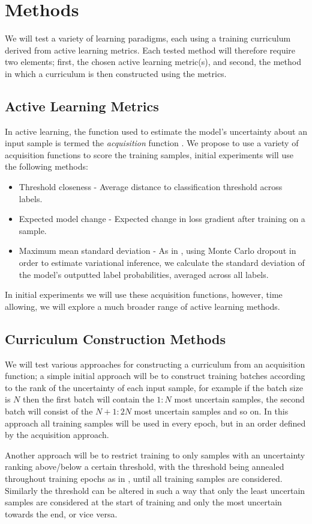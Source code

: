 \documentclass[a4paper,10pt]{article}
\begin{document}
\section{Methods}
We will test a variety of learning paradigms, each using a training curriculum derived from active learning metrics. Each tested method will therefore require two elements; first, the chosen active learning metric(s), and second, the method in which a curriculum is then constructed using the metrics. 
\subsection*{Active Learning Metrics}
In active learning, the function used to estimate the model's uncertainty about an input sample is termed the \textit{acquisition} function \cite{Settles 2009}. We propose to use a variety of acquisition functions to score the training samples, initial experiments will use the following methods:
\begin{itemize}
\item Threshold closeness - Average distance to classification threshold across labels.
\item Expected model change - Expected change in loss gradient after training on a sample.
\item Maximum mean standard deviation - As in \cite{Gal 2016}, using Monte Carlo dropout in order to estimate variational inference, we calculate the standard deviation of the model's outputted label probabilities, averaged across all labels. 
\end{itemize}
In initial experiments we will use these acquisition functions, however, time allowing, we will explore a much broader range of active learning methods.

\subsection*{Curriculum Construction Methods}
We will test various approaches for constructing a curriculum from an acquisition function; a simple initial approach will be to construct training batches according to the rank of the uncertainty of each input sample, for example if the batch size is $N$ then the first batch will contain the $1:N$ most uncertain samples, the second batch will consist of the $N+1:2N$ most uncertain samples and so on. In this approach all training samples will be used in every epoch, but in an order defined by the acquisition approach.

Another approach will be to restrict training to only samples with an uncertainty ranking above/below a certain threshold, with the threshold being annealed throughout training epochs as in \cite{Koller 2010}, until all training samples are considered. Similarly the threshold can be altered in such a way that only the least uncertain samples are considered at the start of training and only the most uncertain towards the end, or vice versa. 
\end{document}
